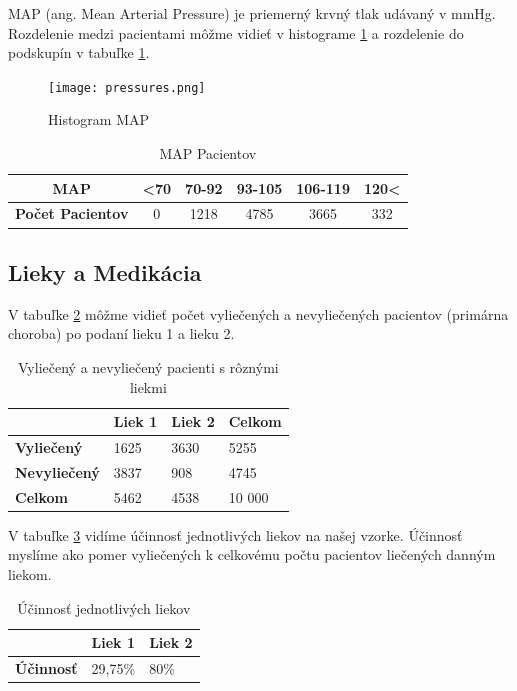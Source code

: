MAP (ang. Mean Arterial Pressure) je priemerný krvný tlak udávaný v mmHg. Rozdelenie medzi pacientami môžme vidieť v histograme \ref{fig:histMAP} a rozdelenie do podskupín v tabuľke \ref{tab:map}.

\begin{figure}[h!]
	\centering
  		\texttt{[image: pressures.png]}
  	\caption{Histogram MAP}
  	\label{fig:histMAP}
\end{figure}


\begin{table}[h!]
\centering
\begin{tabular}{c|ccccc}
\hline
\textbf{MAP} & \textless70 & 70-92 & 93-105 & 106-119 & 120\textless \\ \hline
\textbf{Počet Pacientov} & 0 & 1218  & 4785   & 3665 & 332 \\ \hline
\end{tabular}
\caption{MAP Pacientov}
\label{tab:map}
\end{table}


\subsection{Lieky a Medikácia}

V tabuľke \ref{tab:sick-healthy} môžme vidieť počet vyliečených a nevyliečených pacientov (primárna choroba) po podaní lieku 1 a lieku 2. 

\begin{table}[!h]
\centering
\begin{tabular}{l|lll}
\hline
                     & \textbf{Liek 1} & \textbf{Liek 2} & \textbf{Celkom} \\ \hline
\textbf{Vyliečený}   & 1625            & 3630            & 5255            \\ \hline
\textbf{Nevyliečený} & 3837            & 908             & 4745            \\ \hline
\textbf{Celkom}      & 5462            & 4538            & 10 000          \\ \hline
\end{tabular}
\caption{Vyliečený a nevyliečený pacienti s rôznými liekmi}
\label{tab:sick-healthy}
\end{table}

V tabuľke \ref{tab:ucinnost} vidíme účinnosť jednotlivých liekov na našej vzorke. Účinnosť myslíme ako pomer vyliečených k celkovému počtu pacientov liečených danným liekom.

\begin{table}[!h]
\centering
\begin{tabular}{l|ll}
\hline
                  & \textbf{Liek 1} & \textbf{Liek 2} \\ \hline
\textbf{Účinnosť} & 29,75\%         & 80\%            \\ \hline
\end{tabular}
\caption{Účinnosť jednotlivých liekov}
\label{tab:ucinnost}
\end{table}

